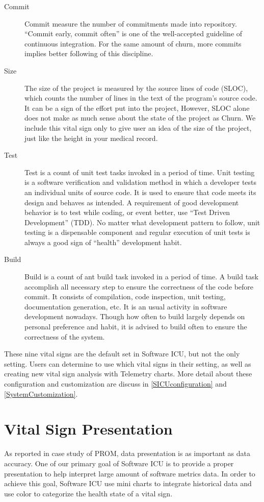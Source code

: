 \begin{description}
\item[Commit] 
Commit measure the number of commitments made into repository. ``Commit early, commit often'' is one of the well-accepted guideline of continuous integration. For the same amount of churn, more commits implies better following of this discipline.

\item[Size] 
The size of the project is measured by the source lines of code (SLOC), which counts the number of lines in the text of the program's source code. It can be a sign of the effort put into the project, However, SLOC alone does not make as much sense about the state of the project as Churn. We include this vital sign only to give user an idea of the size of the project, just like the height in your medical record.

\item[Test] 
Test is a count of unit test tasks invoked in a period of time. Unit testing is a software verification and validation method in which a developer tests an individual units of source code. It is used to ensure that code meets its design and behaves as intended. A requirement of good development behavior is to test while coding, or event better, use ``Test Driven Development'' (TDD). No matter what development pattern to follow, unit testing is a dispensable component and regular execution of unit tests is always a good sign of ``health'' development habit.

\item[Build] 
Build is a count of ant build task invoked in a period of time. A build task accomplish all necessary step to ensure the correctness of the code before commit. It consists of compilation, code inspection, unit testing, documentation generation, etc. It is an usual activity in software development nowadays. Though how often to build largely depends on personal preference and habit, it is advised to build often to ensure the correctness of the system.

\end{description}

These nine vital signs are the default set in Software ICU, but not the only setting. Users can determine to use which vital signs in their setting, as well as creating new vital sign analysis with Telemetry charts. More detail about these configuration and customization are discuss in \autoref{SICUconfiguration} and \autoref{SystemCustomization}.

\section{Vital Sign Presentation}
As reported in case study of PROM, data presentation is as important as data accuracy\cite{prom09}. One of our primary goal of Software ICU is to provide a proper presentation to help interpret large amount of software metrics data. In order to achieve this goal, Software ICU use mini charts to integrate historical data and use color to categorize the health state of a vital sign.

